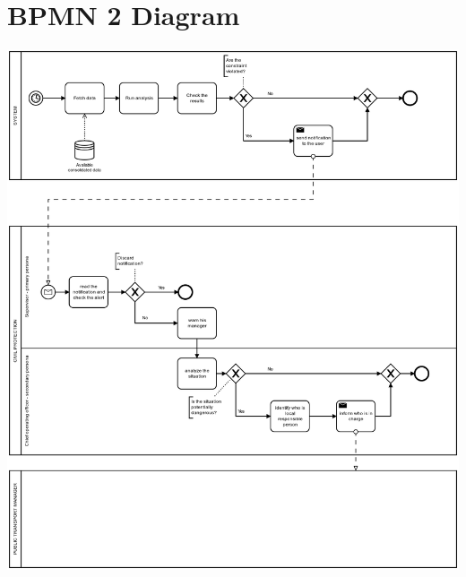\documentclass[../main.tex]{subfiles}
\begin{document}
    \section{BPMN 2 Diagram}\label{sec:bpmn-2-diagram}
    \includegraphics[scale = 0.4]{assets/bpmn2.png}
\end{document}
